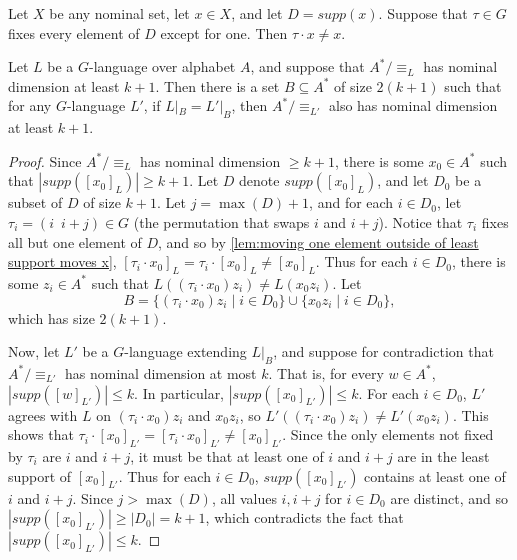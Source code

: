 \documentclass[runningheads]{llncs}
\newif\ifappendix
\begin{document}
\begin{lemma} \label{lem:moving one element outside of least support moves x}
    Let $X$ be any nominal set, let $x \in X$, and let $D = supp(x)$. 
    Suppose that $\tau \in G$ fixes every element of $D$ except for one. 
    Then $\tau \cdot x \neq x$. 
\end{lemma}

\ifappendix The proof of this lemma is given in Appendix \ref{appendix:proof of moving one element outside of least support moves x}. \fi

\begin{proposition} \label{prop:high nominal dimension of L witnessed by small set}
    Let $L$ be a $G$-language over alphabet $A$, and suppose that $A^* / \equiv_L$ has nominal dimension at least $k+1$. 
    Then there is a set $B \subseteq A^*$ of size $2(k+1)$ such that for any $G$-language $L'$, if $L|_B = L'|_B$, then $A^* / \equiv_{L'}$ also has nominal dimension at least $k+1$. 
\end{proposition}

\begin{proof}
    Since $A^* / \equiv_L$ has nominal dimension $\geq k+1$, there is some $x_0 \in A^*$ such that $|supp([x_0]_L)| \geq k+1$. 
    Let $D$ denote $supp([x_0]_L)$, and let $D_0$ be a subset of $D$ of size $k+1$. 
    Let $j = \max(D)+1$, and for each $i \in D_0$, let $\tau_i = (i \enspace i+j) \in G$ (the permutation that swaps $i$ and $i+j$). 
    Notice that $\tau_i$ fixes all but one element of $D$, and so by \autoref{lem:moving one element outside of least support moves x}, $[\tau_i \cdot x_0]_L = \tau_i \cdot [x_0]_L \neq [x_0]_L$.  
    Thus for each $i \in D_0$, there is some $z_i \in A^*$ such that $L((\tau_i \cdot x_0) z_i) \neq L(x_0 z_i)$. 
    Let
    \[
        B = \{(\tau_i \cdot x_0) z_i \mid i \in D_0\} \cup \{x_0 z_i \mid i \in D_0\},
    \]
    which has size $2(k+1)$.
    
    Now, let $L'$ be a $G$-language extending $L|_B$, and suppose for contradiction that $A^* / \equiv_{L'}$ has nominal dimension at most $k$. 
    That is, for every $w \in A^*$, $|supp([w]_{L'})| \leq k$. 
    In particular, $|supp([x_0]_{L'})| \leq k$.
    For each $i \in D_0$, $L'$ agrees with $L$ on $(\tau_i \cdot x_0) z_i$ and $x_0z_i$, so $L'((\tau_i \cdot x_0) z_i) \neq L'(x_0 z_i)$. 
    This shows that $\tau_i \cdot [x_0]_{L'} = [\tau_i \cdot x_0]_{L'} \neq [x_0]_{L'}$. 
    Since the only elements not fixed by $\tau_i$ are $i$ and $i+j$, it must be that at least one of $i$ and $i+j$ are in the least support of $[x_0]_{L'}$. 
    Thus for each $i \in D_0$, $supp([x_0]_{L'})$ contains at least one of $i$ and $i+j$.
    Since $j > \max(D)$, all values $i, i+j$ for $i \in D_0$ are distinct, and so $|supp([x_0]_{L'})| \geq |D_0| = k+1$, which contradicts the fact that $|supp([x_0]_{L'})| \leq k$.
\end{proof}
\end{document}
